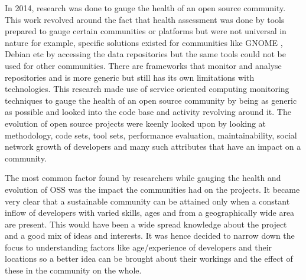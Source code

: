 \documentclass[seploa]{beavtex}
\begin{document}
In 2014, research was done to gauge the health of an open source community. This work revolved around the fact that health assessment was done by tools prepared to gauge certain communities or platforms but were not universal in nature for example, specific solutions existed for communities like GNOME \cite{gno}, Debian\cite{ver2011} etc by accessing the data repositories but the same tools could not be used for other communities\cite{gno}. There are frameworks that monitor and analyse repositories and is more generic but still has its own limitations with technologies\cite{marc2014}. This research made use of service oriented computing monitoring techniques to gauge the health of an open source community by being as generic as possible and looked into the code base and activity revolving around it\cite{marc2014}. The evolution of open source projects were keenly looked upon by looking at methodology, code sets, tool sets, performance evaluation, maintainability, social network growth of developers and many such attributes that have an impact on a community\cite{tarja2013}. 

The most common factor found by researchers while gauging the health and evolution of OSS was the impact the communities had on the projects. It became very clear that a sustainable community can be attained only when a constant inflow of developers with varied skills, ages and from a geographically wide area are present. This would have been a wide spread knowledge about the project and a good mix of ideas and interests. It was hence decided to narrow down the focus to understanding factors like age/experience of developers and their locations so a better idea can be brought about their workings and the effect of these in the community on the whole.
\end{document}
